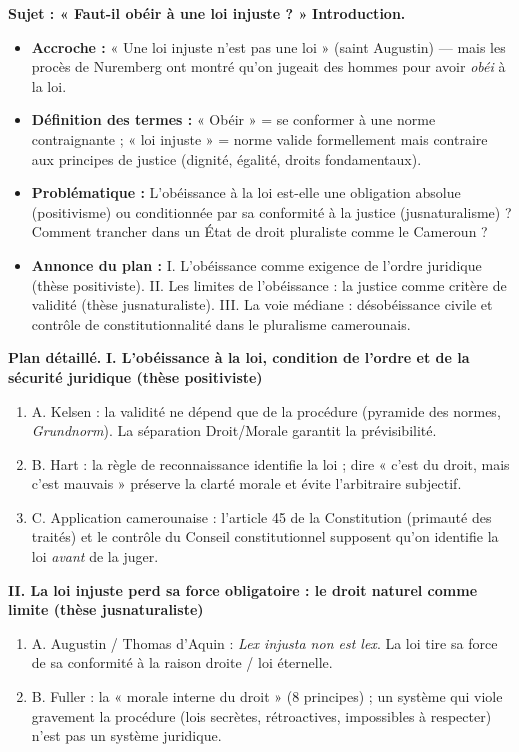 \documentclass[11pt]{article}
\begin{document}
\begin{corrige}[Exercice 3]
\textbf{Sujet : « Faut-il obéir à une loi injuste ? »}
\textbf{Introduction.}
\begin{itemize}
\item \textbf{Accroche :} « Une loi injuste n'est pas une loi » (saint Augustin) — mais les procès de Nuremberg ont montré qu'on jugeait des hommes pour avoir \emph{obéi} à la loi.
\item \textbf{Définition des termes :} « Obéir » = se conformer à une norme contraignante ; « loi injuste » = norme valide formellement mais contraire aux principes de justice (dignité, égalité, droits fondamentaux).
\item \textbf{Problématique :} L'obéissance à la loi est-elle une obligation absolue (positivisme) ou conditionnée par sa conformité à la justice (jusnaturalisme) ? Comment trancher dans un État de droit pluraliste comme le Cameroun ?
\item \textbf{Annonce du plan :} I. L'obéissance comme exigence de l'ordre juridique (thèse positiviste). II. Les limites de l'obéissance : la justice comme critère de validité (thèse jusnaturaliste). III. La voie médiane : désobéissance civile et contrôle de constitutionnalité dans le pluralisme camerounais.
\end{itemize}
\textbf{Plan détaillé.}
\textbf{I. L'obéissance à la loi, condition de l'ordre et de la sécurité juridique (thèse positiviste)}
\begin{enumerate}
\item A. Kelsen : la validité ne dépend que de la procédure (pyramide des normes, \emph{Grundnorm}). La séparation Droit/Morale garantit la prévisibilité.
\item B. Hart : la règle de reconnaissance identifie la loi ; dire « c'est du droit, mais c'est mauvais » préserve la clarté morale et évite l'arbitraire subjectif.
\item C. Application camerounaise : l'article 45 de la Constitution (primauté des traités) et le contrôle du Conseil constitutionnel supposent qu'on identifie la loi \emph{avant} de la juger.
\end{enumerate}
\textbf{II. La loi injuste perd sa force obligatoire : le droit naturel comme limite (thèse jusnaturaliste)}
\begin{enumerate}
\item A. Augustin / Thomas d'Aquin : \emph{Lex injusta non est lex}. La loi tire sa force de sa conformité à la raison droite / loi éternelle.
\item B. Fuller : la « morale interne du droit » (8 principes) ; un système qui viole gravement la procédure (lois secrètes, rétroactives, impossibles à respecter) n'est pas un système juridique.

\end{enumerate}
\end{corrige}
\end{document}
